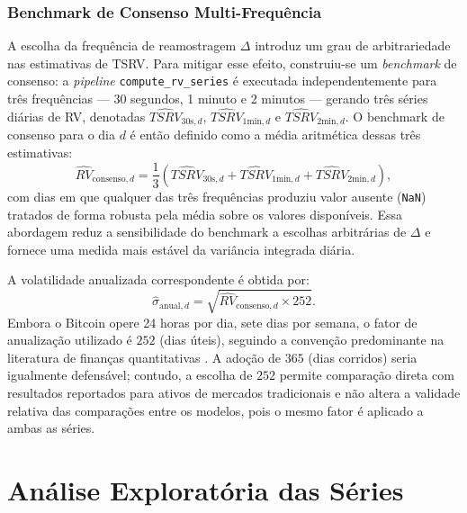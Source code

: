 \subsubsection{Benchmark de Consenso Multi-Frequência}
\label{subsubsec:benchmark_consenso}

A escolha da frequência de reamostragem $\Delta$ introduz um grau de arbitrariedade nas estimativas de TSRV. Para mitigar esse efeito, construiu-se um \emph{benchmark} de consenso: a \emph{pipeline} \texttt{compute\_rv\_series} é executada independentemente para três frequências --- 30 segundos, 1 minuto e 2 minutos --- gerando três séries diárias de RV, denotadas $\widehat{TSRV}_{30\text{s},d}$, $\widehat{TSRV}_{1\text{min},d}$ e $\widehat{TSRV}_{2\text{min},d}$. O benchmark de consenso para o dia $d$ é então definido como a média aritmética dessas três estimativas:
%
\begin{equation}
    \label{eq:rv_consenso}
    \widehat{RV}_{\text{consenso},d} = \frac{1}{3}\!\left(\widehat{TSRV}_{30\text{s},d} + \widehat{TSRV}_{1\text{min},d} + \widehat{TSRV}_{2\text{min},d}\right),
\end{equation}
%
com dias em que qualquer das três frequências produziu valor ausente (\texttt{NaN}) tratados de forma robusta pela média sobre os valores disponíveis. Essa abordagem reduz a sensibilidade do benchmark a escolhas arbitrárias de $\Delta$ e fornece uma medida mais estável da variância integrada diária.

A volatilidade anualizada correspondente é obtida por:
%
\begin{equation}
    \label{eq:vol_anualizada}
    \hat{\sigma}_{\text{anual},d} = \sqrt{\widehat{RV}_{\text{consenso},d} \times 252}.
\end{equation}
%
Embora o Bitcoin opere 24 horas por dia, sete dias por semana, o fator de anualização
utilizado é $252$ (dias úteis), seguindo a convenção predominante na literatura de
finanças quantitativas \cite{andersen2003}. A adoção de $365$ (dias corridos) seria
igualmente defensável; contudo, a escolha de $252$ permite comparação direta com
resultados reportados para ativos de mercados tradicionais e não altera a validade
relativa das comparações entre os modelos, pois o mesmo fator é aplicado a ambas as
séries.

\section{Análise Exploratória das Séries}
\label{sec:met_exploratoria}

